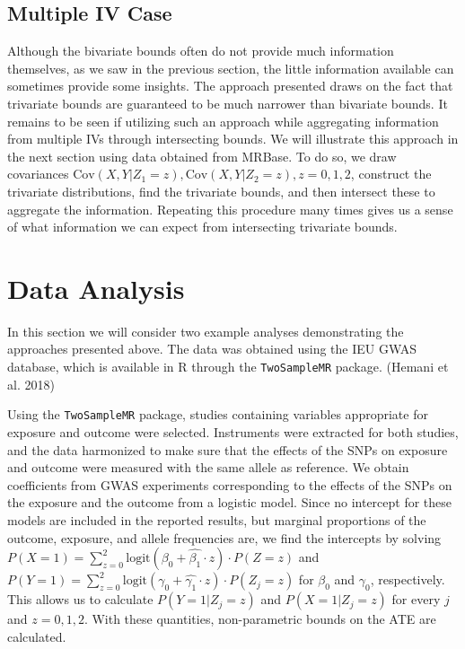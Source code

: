 \documentclass[
]{article}
\theoremstyle{plain}
\begin{document}
\hypertarget{multiple-iv-case}{%
\subsection{Multiple IV Case}\label{multiple-iv-case}}

Although the bivariate bounds often do not provide much information themselves, as we saw in the previous section, the little information available can sometimes provide some insights. The approach presented draws on the fact that trivariate bounds are guaranteed to be much narrower than bivariate bounds. It remains to be seen if utilizing such an approach while aggregating information from multiple IVs through intersecting bounds. We will illustrate this approach in the next section using data obtained from MRBase. To do so, we draw covariances \(\text{Cov}(X, Y | Z_1 = z), \text{Cov}(X,Y | Z_2 = z), z=0,1,2\), construct the trivariate distributions, find the trivariate bounds, and then intersect these to aggregate the information. Repeating this procedure many times gives us a sense of what information we can expect from intersecting trivariate bounds.

\hypertarget{data-analysis}{%
\section{Data Analysis}\label{data-analysis}}

In this section we will consider two example analyses demonstrating the approaches presented above. The data was obtained using the IEU GWAS database, which is available in R through the \texttt{TwoSampleMR} package. (Hemani et al. 2018)

Using the \texttt{TwoSampleMR} package, studies containing variables appropriate for exposure and outcome were selected. Instruments were extracted for both studies, and the data harmonized to make sure that the effects of the SNPs on exposure and outcome were measured with the same allele as reference. We obtain coefficients from GWAS experiments corresponding to the effects of the SNPs on the exposure and the outcome from a logistic model. Since no intercept for these models are included in the reported results, but marginal proportions of the outcome, exposure, and allele frequencies are, we find the intercepts by solving \(P(X = 1) = \sum_{z = 0}^2\text{logit}(\beta_0 + \hat{\beta_1}\cdot z)\cdot P(Z = z)\) and \(P(Y = 1) = \sum_{z = 0}^2\text{logit}(\gamma_0 + \hat{\gamma_1}\cdot z)\cdot P(Z_j = z)\) for \(\beta_0\) and \(\gamma_0\), respectively. This allows us to calculate \(P(Y = 1 | Z_j = z)\) and \(P(X = 1 | Z_j = z)\) for every \(j\) and \(z=0,1,2\). With these quantities, non-parametric bounds on the ATE are calculated.
\end{document}
